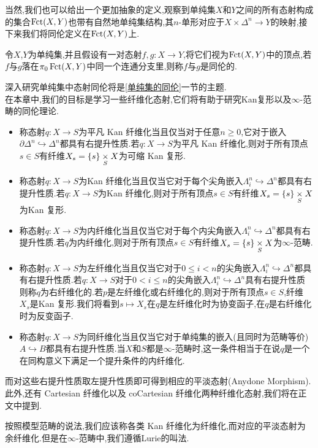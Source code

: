 当然,我们也可以给出一个更加抽象的定义,观察到单纯集$X$和$Y$之间的所有态射构成的集合$\operatorname{Fct}(X,Y)$也带有自然地单纯集结构,其$n$-单形对应于$X\times \Delta^n \to Y$的映射,接下来我们将同伦定义在$\operatorname{Fct}(X,Y)$上.
\begin{definition}\label{定义:单纯集中态射同伦}
    令$X$,$Y$为单纯集,并且假设有一对态射$f,g : X\to Y$,将它们视为$\operatorname{Fct}(X,Y)$中的顶点,若$f$与$g$落在$\pi_0 \operatorname{Fct}(X,Y)$中同一个连通分支里,则称$f$与$g$是同伦的.
\end{definition}
深入研究单纯集中态射同伦将是\ref{单纯集的同伦}一节的主题.\\
在本章中,我们的目标是学习一些纤维化态射,它们将有助于研究Kan复形以及$\infty$-范畴的同伦理论.
\begin{itemize}
    \item 称态射$q: X\to S$为平凡 Kan 纤维化当且仅当对于任意$n \geq 0$,它对于嵌入$\partial \Delta^n \hookrightarrow \Delta^n$都具有右提升性质.若$q: X \to S$为平凡 Kan 纤维化,则对于所有顶点$s\in S$有纤维$X_s = \{s\} \underset{S}{\times} X$为可缩 Kan 复形.
    \item 称态射$q: X\to S$为Kan 纤维化当且仅当它对于每个尖角嵌入$\Lambda_i^n \hookrightarrow \Delta^n$都具有右提升性质.若$q: X \to S$为Kan 纤维化,则对于所有顶点$s\in S$有纤维$X_s = \{s\} \underset{S}{\times} X$为Kan 复形.
    \item 称态射$q: X\to S$为内纤维化当且仅当它对于每个内尖角嵌入$\Lambda_i^n \hookrightarrow \Delta^n$都具有右提升性质.若$q$为内纤维化,则对于所有顶点$s\in S$有纤维$X_s = \{s\} \underset{S}{\times} X$为$\infty$-范畴.
    \item 称态射$q: X\to S$为左纤维化当且仅当它对于$0\leq i <n$的尖角嵌入$\Lambda_i^n \hookrightarrow \Delta^n$都具有右提升性质.若$q:X \to S$对于$0< i \leq n$的尖角嵌入$\Lambda_i^n \hookrightarrow \Delta^n$具有右提升性质则称$q$为右纤维化的.若$p$是左纤维化或右纤维化的,则对于所有顶点$s\in S$,纤维$X_s$是Kan 复形.我们将看到$s\mapsto X_s$在$q$是左纤维化时为协变函子,在$q$是右纤维化时为反变函子.
    \item 称态射$q: X\to S$为同纤维化当且仅当它对于单纯集的嵌入(且同时为范畴等价)$A \hookrightarrow B$都具有右提升性质.当$X$和$S$都是$\infty$-范畴时,这一条件相当于在说$q$是一个在同构意义下满足一个提升条件的内纤维化.
\end{itemize}
而对这些右提升性质取左提升性质即可得到相应的平淡态射(Anydone Morphism).\\
此外,还有 Cartesian 纤维化以及 coCartesian 纤维化两种纤维化态射,我们将在正文中提到.
\begin{remark}
    按照模型范畴的说法,我们应该称各类 Kan 纤维化为纤维化,而对应的平淡态射为余纤维化.但是在$\infty$-范畴中,我们遵循Lurie的叫法.
\end{remark}
